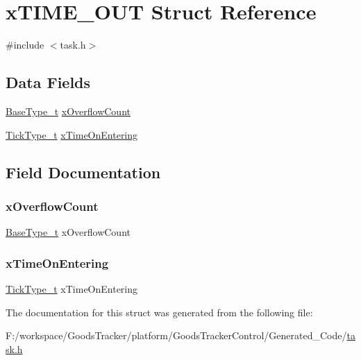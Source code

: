 \hypertarget{structx_t_i_m_e___o_u_t}{}\section{x\+T\+I\+M\+E\+\_\+\+O\+UT Struct Reference}
\label{structx_t_i_m_e___o_u_t}


{\ttfamily \#include $<$task.\+h$>$}

\subsection*{Data Fields}
\begin{DoxyCompactItemize}
\item 
\hyperlink{portmacro_8h_a46fb21e00ae0729d7515c0fbf2269796}{Base\+Type\+\_\+t} \hyperlink{structx_t_i_m_e___o_u_t_a5d03952a36301f2056265f3fff437b55}{x\+Overflow\+Count}
\item 
\hyperlink{portmacro_8h_aa69c48c6e902ce54f70886e6573c92a9}{Tick\+Type\+\_\+t} \hyperlink{structx_t_i_m_e___o_u_t_adebf6236514a7e0fa24464dcf4100f14}{x\+Time\+On\+Entering}
\end{DoxyCompactItemize}


\subsection{Field Documentation}
\mbox{\label{structx_t_i_m_e___o_u_t_a5d03952a36301f2056265f3fff437b55}} 
\subsubsection{\texorpdfstring{x\+Overflow\+Count}{xOverflowCount}}
{\footnotesize\ttfamily \hyperlink{portmacro_8h_a46fb21e00ae0729d7515c0fbf2269796}{Base\+Type\+\_\+t} x\+Overflow\+Count}

\mbox{\label{structx_t_i_m_e___o_u_t_adebf6236514a7e0fa24464dcf4100f14}} 
\subsubsection{\texorpdfstring{x\+Time\+On\+Entering}{xTimeOnEntering}}
{\footnotesize\ttfamily \hyperlink{portmacro_8h_aa69c48c6e902ce54f70886e6573c92a9}{Tick\+Type\+\_\+t} x\+Time\+On\+Entering}



The documentation for this struct was generated from the following file\+:\begin{DoxyCompactItemize}
\item 
F\+:/workspace/\+Goods\+Tracker/platform/\+Goods\+Tracker\+Control/\+Generated\+\_\+\+Code/\hyperlink{task_8h}{task.\+h}\end{DoxyCompactItemize}
